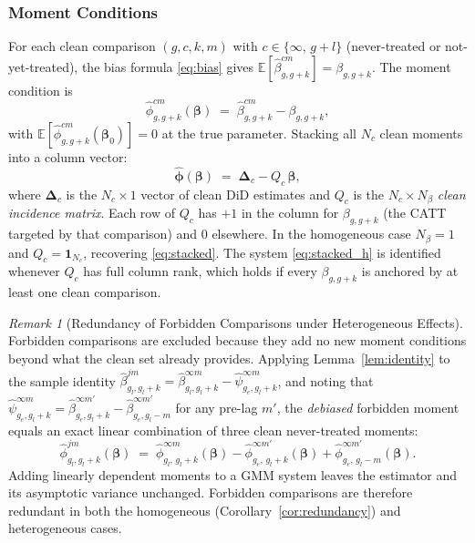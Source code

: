 \documentclass[12pt,letterpaper]{article}
\theoremstyle{remark}
\newtheorem{remark}{Remark}[section]
\theoremstyle{definition}
\newcommand{\E}{\mathbb{E}}
\newcommand{\hbeta}{\hat{\beta}}
\newcommand{\hpsi}{\hat{\psi}}     %
\begin{document}
\subsubsection{Moment Conditions}
\label{sec:gmm_hetero_moments}

For each clean comparison $(g,c,k,m)$ with $c\in\{\infty,\,g+l\}$
(never-treated or not-yet-treated), the bias formula \eqref{eq:bias}
gives $\E[\hbeta^{cm}_{g,g+k}]=\beta_{g,g+k}$. The moment condition is
\begin{equation}
  \hat{\phi}^{cm}_{g,g+k}(\boldsymbol{\beta})
  \;=\;
  \hbeta^{cm}_{g,g+k} - \beta_{g,g+k},
  \label{eq:moment_clean_h}
\end{equation}
with $\E[\hat{\phi}^{cm}_{g,g+k}(\boldsymbol{\beta}_0)]=0$ at the true
parameter. Stacking all $N_c$ clean moments into a column vector:
\begin{equation}
  \hat{\boldsymbol{\phi}}(\boldsymbol{\beta})
  \;=\;
  \boldsymbol{\Delta}_c - Q_c\,\boldsymbol{\beta},
  \label{eq:stacked_h}
\end{equation}
where $\boldsymbol{\Delta}_c$ is the $N_c\times1$ vector of clean DiD
estimates and $Q_c$ is the $N_c\times N_\beta$ \emph{clean incidence matrix}.
Each row of $Q_c$ has $+1$ in the column for $\beta_{g,g+k}$ (the CATT
targeted by that comparison) and $0$ elsewhere. In the homogeneous case
$N_\beta=1$ and $Q_c=\mathbf{1}_{N_c}$, recovering \eqref{eq:stacked}.
The system \eqref{eq:stacked_h} is identified whenever $Q_c$ has full
column rank, which holds if every $\beta_{g,g+k}$ is anchored by at least
one clean comparison.

\begin{remark}[Redundancy of Forbidden Comparisons under Heterogeneous Effects]
  \label{rem:redund_hetero}
  Forbidden comparisons are excluded because they add no new moment
  conditions beyond what the clean set already provides. Applying
  Lemma~\ref{lem:identity} to the sample identity
  $\hbeta^{jm}_{g_l,g_l+k}=\hbeta^{\infty m}_{g_l,g_l+k}-
  \hpsi^{\infty m}_{g_e,g_l+k}$, and noting that
  $\hpsi^{\infty m}_{g_e,g_l+k}=\hbeta^{\infty m'}_{g_e,g_l+k}-
  \hbeta^{\infty m'}_{g_e,g_l-m}$ for any pre-lag $m'$, the
  \emph{debiased} forbidden moment equals an exact linear combination of
  three clean never-treated moments:
  \[
    \hat{\phi}^{jm}_{g_l,g_l+k}(\boldsymbol{\beta})
    \;=\;
    \hat{\phi}^{\infty m}_{g_l,\,g_l+k}(\boldsymbol{\beta})
    -\hat{\phi}^{\infty m'}_{g_e,\,g_l+k}(\boldsymbol{\beta})
    +\hat{\phi}^{\infty m'}_{g_e,\,g_l-m}(\boldsymbol{\beta}).
  \]
  Adding linearly dependent moments to a GMM system leaves the estimator
  and its asymptotic variance unchanged. Forbidden comparisons are therefore
  redundant in both the homogeneous (Corollary~\ref{cor:redundancy}) and
  heterogeneous cases.
\end{remark}
\end{document}
